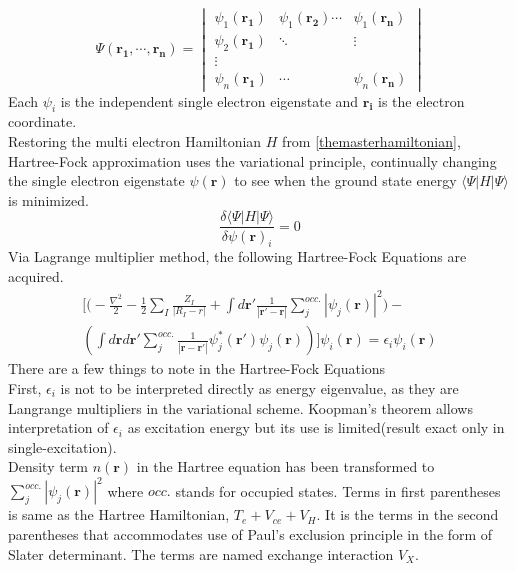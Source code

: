 \documentclass{article}
\begin{document}
$$\Psi(\mathbf{r_{1},\cdots,\mathbf{r_{n}}})=\begin{vmatrix}
		\psi_{1}(\mathbf{r_{1}}) & \psi_{1}(\mathbf{r_{2}})\cdots & \psi_{1}(\mathbf{r_{n}}) \\
		\psi_{2}(\mathbf{r_{1}}) & \ddots                         & \vdots                   \\
		\vdots                                                                               \\
		\psi_{n}(\mathbf{r_{1}}) & \cdots                         & \psi_{n}(\mathbf{r_{n}})
	\end{vmatrix}$$
Each $\psi_{i}$ is the independent single electron eigenstate and  $\mathbf{r_{i}}$ is the electron coordinate. \\
Restoring the multi electron Hamiltonian $H$ from \eqref{themasterhamiltonian}, Hartree-Fock approximation uses the variational principle, continually changing the single electron eigenstate $\psi(\mathbf{r})$ to see when the ground state energy $\langle\Psi|H|\Psi\rangle$ is minimized.
\begin{equation}
	\frac{\delta\langle\Psi|H|\Psi\rangle}{\delta\psi(\mathbf{r})_{i}}=0\label{hartreevariational}
\end{equation}
Via Lagrange multiplier method, the following Hartree-Fock Equations are acquired.
\begin{multline}
	\Biggl[\Biggl(-\frac{\nabla^{2}}{2}-\frac{1}{2}\sum_{I}\frac{Z_{I}}{|R_{I}-r|}+\int d\mathbf{r}'\frac{1}{|\mathbf{r'}-\mathbf{r}|}\sum_{j}^{occ.}|\psi_{j}(\mathbf{r})|^{2}\Biggr)-\\ \left(\int d\mathbf{r}d\mathbf{r'}\sum_{j}^{occ.}\frac{1}{|\mathbf{r}-\mathbf{r'}|}
		\psi_{j}^{*}(\mathbf{r'})\psi_{j}(\mathbf{r})\right)\Biggr]\psi_{i}(\mathbf{r})=\epsilon_{i}\psi_{i}(\mathbf{r})\label{expandedhartreefock}
\end{multline}
There are a few things to note in the Hartree-Fock Equations\\
First, $\epsilon_{i}$ is not to be interpreted directly as energy eigenvalue, as they are Langrange multipliers in the variational scheme. Koopman's theorem allows interpretation of $\epsilon_{i}$ as excitation energy but its use is limited(result exact only in single-excitation).\\
Density term $n(\mathbf{r})$ in the Hartree equation has been transformed to $\sum_{j}^{occ.}|\psi_{j}(\mathbf{r})|^{2}$ where $occ.$ stands for occupied states. Terms in first parentheses is same as the Hartree Hamiltonian, $T_{e}+V_{ce}+V_{H}$. It is the terms in the second parentheses that accommodates use of Paul's exclusion principle in the form of Slater determinant. The terms are named exchange interaction $V_{X}$.\\
\end{document}
